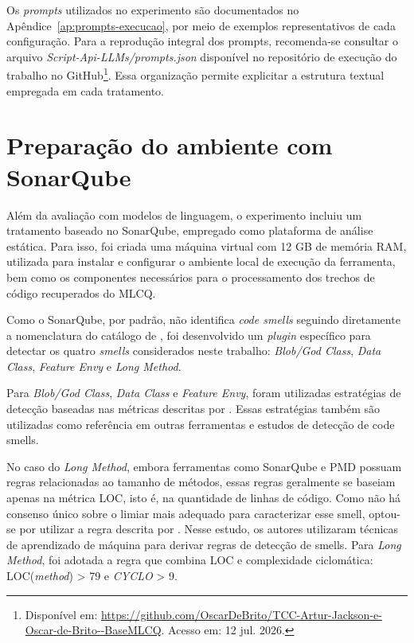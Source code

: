 Os \textit{prompts} utilizados no experimento são documentados no Apêndice~\ref{ap:prompts-execucao}, por meio de exemplos representativos de cada configuração. Para a reprodução integral dos prompts, recomenda-se consultar o arquivo \textit{Script-Api-LLMs/prompts.json} disponível no repositório de execução do trabalho no GitHub\footnote{\label{fn:repo}Disponível em: \url{https://github.com/OscarDeBrito/TCC-Artur-Jackson-e-Oscar-de-Brito--BaseMLCQ}. Acesso em: 12 jul. 2026.}. Essa organização permite explicitar a estrutura textual empregada em cada tratamento.

\section{Preparação do ambiente com SonarQube}

Além da avaliação com modelos de linguagem, o experimento incluiu um tratamento baseado no SonarQube, empregado como plataforma de análise estática. Para isso, foi criada uma máquina virtual com 12 GB de memória RAM, utilizada para instalar e configurar o ambiente local de execução da ferramenta, bem como os componentes necessários para o processamento dos trechos de código recuperados do MLCQ.

Como o SonarQube, por padrão, não identifica \textit{code smells} seguindo diretamente a nomenclatura do catálogo de , 
foi desenvolvido um \textit{plugin} específico para detectar os quatro \textit{smells} considerados neste trabalho: \textit{Blob/God Class}, \textit{Data Class}, \textit{Feature Envy} e \textit{Long Method}.

Para \textit{Blob/God Class}, \textit{Data Class} e \textit{Feature Envy}, foram utilizadas estratégias de detecção baseadas nas métricas descritas 
por . Essas estratégias também são utilizadas 
como referência em outras ferramentas e estudos de detecção de code smells.

No caso do \textit{Long Method}, embora ferramentas como SonarQube e PMD possuam regras relacionadas ao tamanho de métodos, 
essas regras geralmente se baseiam apenas na métrica LOC, isto é, na quantidade de linhas de código. 
Como não há consenso único sobre o limiar mais adequado para caracterizar esse smell, optou-se por utilizar a regra 
descrita por . 
Nesse estudo, os autores utilizaram técnicas de aprendizado de máquina para derivar regras de detecção de smells. 
Para \textit{Long Method}, foi adotada a regra que combina LOC e complexidade ciclomática: LOC(\textit{method}) > 79 e \textit{CYCLO} > 9.

